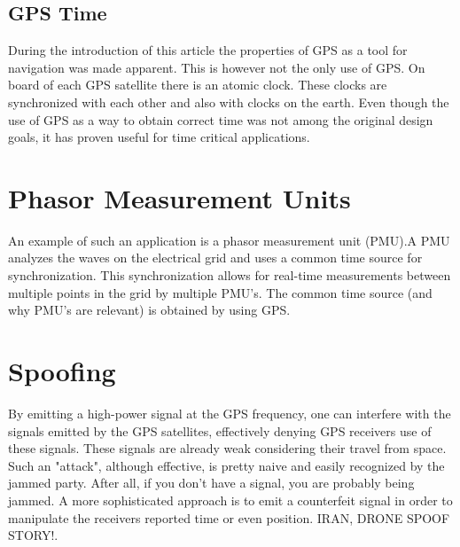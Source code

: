 \documentclass[12pt,english,a4paper]{article}
\begin{document}
\subsection{GPS Time}
During the introduction of this article the properties of GPS as a tool for navigation was made apparent. This is however not the only use of GPS. On board of each GPS satellite there is an atomic clock. These clocks are synchronized with each other and also with clocks on the earth. Even though the use of GPS as a way to obtain correct time was not among the original design goals, it has proven useful for time critical applications. 

\section{Phasor Measurement Units}
An example of such an application is a phasor measurement unit (PMU).A PMU analyzes the waves on the electrical grid and uses a common time source for synchronization. This synchronization allows for real-time measurements between multiple points in the grid by multiple PMU's. The common time source (and why PMU's are relevant) is obtained by using GPS. \cite{YLJRNR}

\section{Spoofing}
By emitting a high-power signal at the GPS frequency, one can interfere with the signals emitted by the GPS satellites, effectively denying GPS receivers use of these signals. These signals are already weak considering their travel from space. Such an "attack", although effective, is pretty naive and easily recognized by the jammed party. After all, if you don't have a signal, you are probably being jammed. A more sophisticated approach is to emit a counterfeit signal in order to manipulate the receivers reported time or even position. IRAN, DRONE SPOOF STORY!. 


\newpage
\printbibliography[title={Complete Bibliography},heading=bibintoc]
\end{document}
